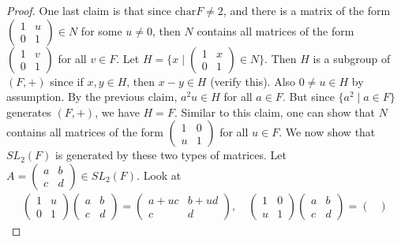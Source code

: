 \begin{proof}
    One last claim is that since $\mathrm{char} F \neq 2$, and there is a matrix of the form $\begin{pmatrix}
        1 & u \\ 0 & 1
    \end{pmatrix} \in N$ for some $u \neq 0$, then $N$ contains all matrices of the form $\begin{pmatrix}
        1 & v \\ 0 & 1
    \end{pmatrix}$ for all $v \in F$. Let $H = \{x \mid \begin{pmatrix}
        1 & x \\ 0 & 1
    \end{pmatrix} \in N\}$. Then $H$ is a subgroup of $(F,+)$ since if $x,y \in H$, then $x-y \in H$ (verify this). Also $0 \neq u \in H$ by assumption. By the previous claim, $a^{2}u \in H$ for all $a \in F$. But since $\{a^{2} \mid a \in F\}$ generates $(F,+)$, we have $H = F$. Similar to this claim, one can show that $N$ contains all matrices of the form $\begin{pmatrix}
        1 & 0 \\ u & 1
    \end{pmatrix}$ for all $u \in F$. We now show that $SL_{2}(F)$ is generated by these two types of matrices. Let $A = \begin{pmatrix}
        a & b \\ c & d
    \end{pmatrix} \in SL_{2}(F)$. Look at
    \begin{align}
        \begin{pmatrix}
            1 & u \\ 0 & 1
        \end{pmatrix} \begin{pmatrix}
            a & b \\ c & d
        \end{pmatrix} = \begin{pmatrix}
            a+uc & b+ud \\ c & d
        \end{pmatrix},\quad \begin{pmatrix}
            1 & 0 \\ u & 1
        \end{pmatrix} \begin{pmatrix}
            a & b \\ c & d
        \end{pmatrix} = \begin{pmatrix}

\end{pmatrix}
\end{align}
\end{proof}
